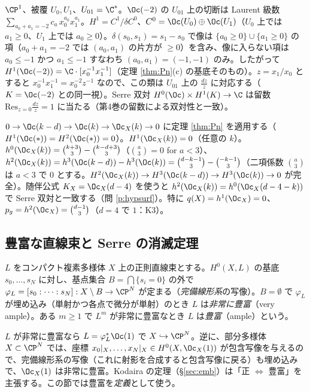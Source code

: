 \begin{ex}\label{ex:P1cech}
$\CP^1$、被覆 $U_0,U_1$、$U_{01}=\C^*$。$\Oc(-2)$ の $U_{01}$ 上の切断は Laurent 級数 $\sum_{a_0+a_1=-2}c_a\,x_0^{a_0}x_1^{a_1}$。$H^1=C^1/\delta C^0$、$C^0=\Oc(U_0)\oplus\Oc(U_1)$（$U_0$ 上では $a_1\ge0$、$U_1$ 上では $a_0\ge0$）。$\delta(s_0,s_1)=s_1-s_0$ で像は $\{a_0\ge0\}\cup\{a_1\ge0\}$ の項（$a_0+a_1=-2$ では $(a_0,a_1)$ の片方が $\ge0$）を含み、像に入らない項は $a_0\le-1$ かつ $a_1\le-1$ すなわち $(a_0,a_1)=(-1,-1)$ のみ。したがって $H^1(\Oc(-2))=\C\cdot[x_0^{-1}x_1^{-1}]$（定理 \ref{thm:Pn}(c) の基底そのもの）。$z=x_1/x_0$ とすると $x_0^{-1}x_1^{-1}=x_0^{-2}z^{-1}$ なので、この類は $U_{01}$ 上の $\frac{dz}{z}$ に対応する（$K=\Oc(-2)$ との同一視）。Serre 双対 $H^0(\Oc)\times H^1(K)\to\C$ は留数 $\mathrm{Res}_{z=0}\frac{dz}z=1$ に当たる（第4巻の留数による双対性と一致）。
\end{ex}
\begin{ex}[曲面 $X_d\subset\CP^3$ の $\Oc_X(k)$]\label{ex:hypersurfaceCoh}\tP
$0\to\Oc(k-d)\to\Oc(k)\to\Oc_X(k)\to0$ に定理 \ref{thm:Pn} を適用する（$H^1(\Oc(\ast))=H^2(\Oc(\ast))=0$）。$H^1(\Oc_X(k))=0$（任意の $k$）。$h^0(\Oc_X(k))=\binom{k+3}3-\binom{k-d+3}3$（$\binom{a}{3}=0$ for $a<3$）、$h^2(\Oc_X(k))=h^3(\Oc(k-d))-h^3(\Oc(k))=\binom{d-k-1}3-\binom{-k-1}3$（二項係数 $\binom a3$ は $a<3$ で $0$ とする。$H^2(\Oc_X(k))\to H^3(\Oc(k-d))\to H^3(\Oc(k))\to0$ が完全）。随伴公式 $K_X=\Oc_X(d-4)$ を使うと $h^2(\Oc_X(k))=h^0(\Oc_X(d-4-k))$ で Serre 双対と一致する（問 \ref{p:hypsurf}）。特に $q(X)=h^1(\Oc_X)=0$、$p_g=h^2(\Oc_X)=\binom{d-1}3$（$d=4$ で $1$：K3）。
\end{ex}

\subsection{豊富な直線束と Serre の消滅定理}
\begin{defn}[非常に豊富・豊富]
$L$ をコンパクト複素多様体 $X$ 上の正則直線束とする。$H^0(X,L)$ の基底 $s_0,\dots,s_N$ に対し、基点集合 $B=\bigcap\{s_i=0\}$ の外で $\varphi_L=[s_0:\cdots:s_N]:X\setminus B\to\CP^N$ が定まる（\emph{完備線形系}の写像）。$B=\emptyset$ で $\varphi_L$ が埋め込み（単射かつ各点で微分が単射）のとき $L$ は\emph{非常に豊富}（very ample）。ある $m\ge1$ で $L^m$ が非常に豊富なとき $L$ は\emph{豊富}（ample）という。
\end{defn}
$L$ が非常に豊富なら $L=\varphi_L^*\Oc(1)$ で $X\hookrightarrow\CP^N$。逆に、部分多様体 $X\subset\CP^N$ では、座標 $x_0|_X,\dots,x_N|_X\in H^0(X,\Oc_X(1))$ が包含写像を与えるので、完備線形系の写像（これに射影を合成すると包含写像に戻る）も埋め込みで、$\Oc_X(1)$ は非常に豊富。Kodaira の定理（\S\ref{sec:emb}）は「正 $\iff$ 豊富」を主張する。この節では豊富を\emph{定義}として使う。

